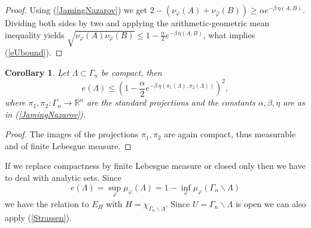 \documentclass[12pt,a4paper,draft]{article}
\newcommand{\RR}[1]{\mathbb{R}^#1}
\newtheorem{corollary}{Corollary}
\begin{document}
\begin{proof}
Using (\ref{JamingNazarov})  we get 
$2-\left(\nu_{\varphi}(A)+\nu_{\hat\varphi}(B)\right)\geq \alpha 
  e^{-\beta\,\eta(A,B)}$. Dividing both sides by two and applying the
  arithmetic-geometric mean inequality yields 
  $ \sqrt{\nu_{\varphi}(A)\nu_{\hat\varphi}(B)}\leq 
     1-\frac{\alpha}{2} e^{-\beta\, \eta(A,B)}$, what implies (\ref{eUbound}).
\end{proof}

\begin{corollary}
Let $\Lambda\subset\Gamma_n$ be compact, then
\begin{equation}
             e(\Lambda) \leq 
      \left( 1-\frac{\alpha}{2} e^{-\beta\, 
          \eta(\pi_1(\Lambda),\pi_2(\Lambda))} \right)^2,
\end{equation}
where $\pi_1,\pi_2:\Gamma_n \rightarrow {\RR n}$ are the standard projections
and the constants $\alpha,\beta,\eta$ are as in (\ref{JamingNazarov}). 
\end{corollary}

\begin{proof}
The images of the projections $\pi_1,\pi_2$ are again compact, thus measurable
and of finite Lebesgue measure. 
\end{proof}
\rm
If we replace compactness by finite Lebesgue measure or closed only then
we have to deal with analytic sets. 
Since 
\begin{displaymath}
    e(\Lambda)=\sup_{\varphi} \mu_{\varphi}(\Lambda)=
      1-\inf_{\varphi} \mu_{\varphi}(\Gamma_n\backslash\Lambda)
\end{displaymath}
we have the relation to $E_H$ with $H=\chi_{\Gamma_n\backslash\Lambda}$. Since
$U=\Gamma_n\backslash\Lambda$ is open we can also apply (\ref{Strassen}). 



\end{document}
